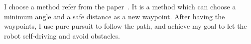 \documentclass[letterpaper, 10 pt, conference]{ieeeconf}  %
\begin{document}
I choose a method refer from the paper~\cite{1527001}. It is a method which can choose a minimum angle and a safe distance as a new waypoint. After having the waypoints, I use pure pursuit to follow the path, and achieve my goal to let the robot self-driving and avoid obstacles.

\addtolength{\textheight}{-12cm}   %



\end{document}
